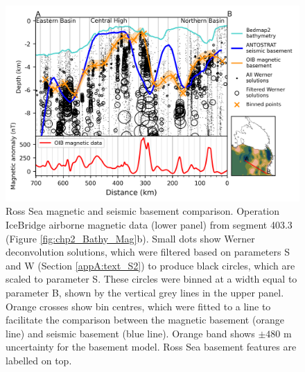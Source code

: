 \begin{figure}[!ht]
    \centering
    \includegraphics[width=.95\textwidth]{figures/chp2/figure_S2.png}
    \caption[OIB 403.3 magnetic and seismic basement comparison]{Ross Sea magnetic and seismic basement comparison. Operation IceBridge airborne magnetic data (lower panel) from segment 403.3 (Figure \ref{fig:chp2_Bathy_Mag}b). Small dots show Werner deconvolution solutions, which were filtered based on parameters S and W (Section \ref{appA:text_S2}) to produce black circles, which are scaled to parameter S. These circles were binned at a width equal to parameter B, shown by the vertical grey lines in the upper panel. Orange crosses show bin centres, which were fitted to a line to facilitate the comparison between the magnetic basement (orange line) and seismic basement (blue line). Orange band shows $\pm480$ m uncertainty for the basement model. Ross Sea basement features are labelled on top.}
    \label{fig:appA_S2}
\end{figure}

